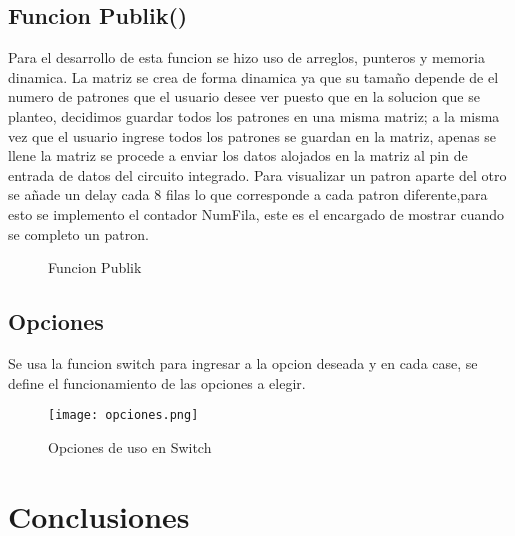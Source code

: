 \documentclass{article}
\begin{document}
\subsection{Funcion Publik()}
Para el desarrollo de esta funcion se hizo uso de arreglos, punteros y memoria dinamica. La matriz se crea de forma dinamica ya que su tamaño depende de el numero de patrones que el usuario desee ver puesto que en la solucion que se planteo, decidimos guardar todos los patrones en una misma matriz; a la misma vez que el usuario ingrese todos los patrones se guardan en la matriz, apenas se llene la matriz se procede a enviar los datos alojados en la matriz al pin de entrada de datos del circuito integrado.
Para visualizar un patron aparte del otro se añade un delay cada 8 filas lo que corresponde a cada patron diferente,para esto se implemento el contador NumFila, este es el encargado de mostrar cuando se completo un patron.

\begin{figure}
 \centering
 \caption{Funcion Publik}
 \label{f:Publik}
\end{figure}


\subsection{Opciones}
Se usa la funcion switch para ingresar a la opcion deseada y en cada case, se define el funcionamiento de las opciones a elegir.
    \begin{figure}[h]
    \texttt{[image: opciones.png]}
    \centering
    \caption{Opciones de uso en Switch}
    \label{fig:opciones}
    \end{figure}


\section{Conclusiones}
\label{Algoritmo}





\end{document}
